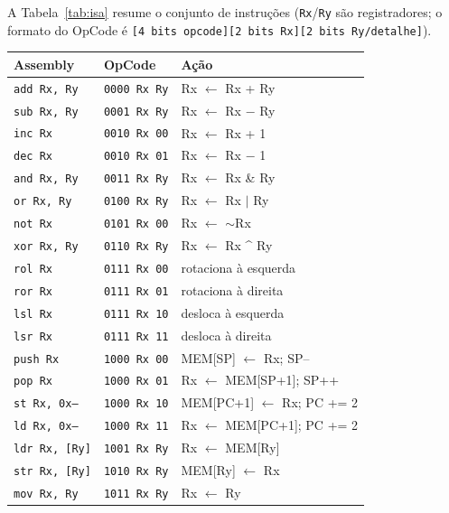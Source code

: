 \documentclass[12pt,a4paper]{article}
\begin{document}
A Tabela~\ref{tab:isa} resume o conjunto de instruções (\texttt{Rx}/\texttt{Ry} são
registradores; o formato do OpCode é \texttt{[4 bits opcode][2 bits Rx][2 bits Ry/detalhe]}).

\begin{table}[H]
\centering
\small
\begin{tabular}{lll}
\hline
\textbf{Assembly} & \textbf{OpCode} & \textbf{Ação} \\
\hline
\texttt{add Rx, Ry}  & \texttt{0000 Rx Ry} & Rx $\leftarrow$ Rx + Ry \\
\texttt{sub Rx, Ry}  & \texttt{0001 Rx Ry} & Rx $\leftarrow$ Rx $-$ Ry \\
\texttt{inc Rx}      & \texttt{0010 Rx 00} & Rx $\leftarrow$ Rx + 1 \\
\texttt{dec Rx}      & \texttt{0010 Rx 01} & Rx $\leftarrow$ Rx $-$ 1 \\
\texttt{and Rx, Ry}  & \texttt{0011 Rx Ry} & Rx $\leftarrow$ Rx \& Ry \\
\texttt{or Rx, Ry}   & \texttt{0100 Rx Ry} & Rx $\leftarrow$ Rx $|$ Ry \\
\texttt{not Rx}      & \texttt{0101 Rx 00} & Rx $\leftarrow$ $\sim$Rx \\
\texttt{xor Rx, Ry}  & \texttt{0110 Rx Ry} & Rx $\leftarrow$ Rx \^{} Ry \\
\texttt{rol Rx}      & \texttt{0111 Rx 00} & rotaciona à esquerda \\
\texttt{ror Rx}      & \texttt{0111 Rx 01} & rotaciona à direita \\
\texttt{lsl Rx}      & \texttt{0111 Rx 10} & desloca à esquerda \\
\texttt{lsr Rx}      & \texttt{0111 Rx 11} & desloca à direita \\
\texttt{push Rx}     & \texttt{1000 Rx 00} & MEM[SP] $\leftarrow$ Rx; SP-- \\
\texttt{pop Rx}      & \texttt{1000 Rx 01} & Rx $\leftarrow$ MEM[SP+1]; SP++ \\
\texttt{st Rx, 0x--} & \texttt{1000 Rx 10} & MEM[PC+1] $\leftarrow$ Rx; PC += 2 \\
\texttt{ld Rx, 0x--} & \texttt{1000 Rx 11} & Rx $\leftarrow$ MEM[PC+1]; PC += 2 \\
\texttt{ldr Rx, [Ry]}& \texttt{1001 Rx Ry} & Rx $\leftarrow$ MEM[Ry] \\
\texttt{str Rx, [Ry]}& \texttt{1010 Rx Ry} & MEM[Ry] $\leftarrow$ Rx \\
\texttt{mov Rx, Ry}  & \texttt{1011 Rx Ry} & Rx $\leftarrow$ Ry \\

\end{tabular}
\end{table}
\end{document}
